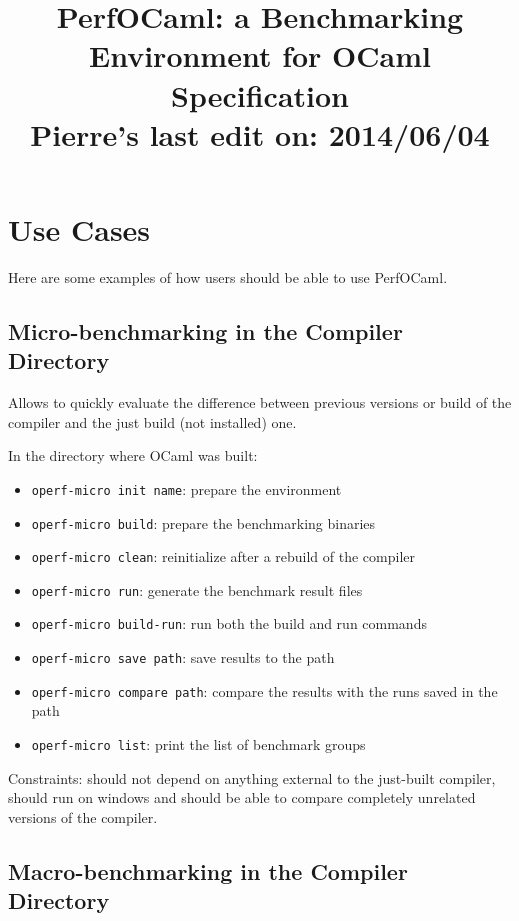 \documentclass[11pt,a4paper]{article}
\begin{document}
\title{PerfOCaml: a Benchmarking Environment for OCaml\\Specification\\Pierre's last edit on: 2014/06/04}

\maketitle
\tableofcontents
\section{Use Cases}

Here are some examples of how users should be able to use PerfOCaml.

\subsection{Micro-benchmarking in the Compiler Directory}

Allows to quickly evaluate the difference between previous versions or
build of the compiler and the just build (not installed) one.

In the directory where OCaml was built:
\begin{itemize}
\item {\tt operf-micro init name}: prepare the environment
\item {\tt operf-micro build}: prepare the benchmarking binaries
\item {\tt operf-micro clean}: reinitialize after a rebuild of the compiler
\item {\tt operf-micro run}: generate the benchmark result files
\item {\tt operf-micro build-run}: run both the build and run commands
\item {\tt operf-micro save path}: save results to the path
\item {\tt operf-micro compare path}: compare the results with the runs saved in the path
\item {\tt operf-micro list}: print the list of benchmark groups
\end{itemize}

Constraints: should not depend on anything external to the just-built
compiler, should run on windows and should be able to compare
completely unrelated versions of the compiler.

\subsection{Macro-benchmarking in the Compiler Directory}
\end{document}
